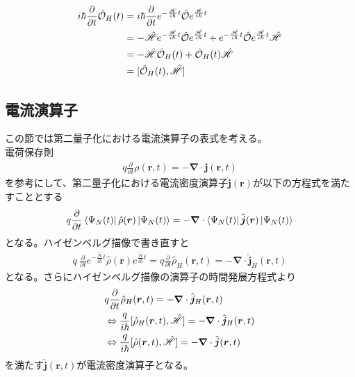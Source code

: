 \documentclass[dvipdfmx, 11pt, a4paper]{jsarticle}
\theoremstyle{definition}
\numberwithin{equation}{section}
\begin{document}
    \begin{derivationBox}
        \begin{align}
            i\hbar \frac{\partial}{\partial t} \hat{\mathcal{O}}_H(t) &= i\hbar \frac{\partial}{\partial t} e^{-\frac{\hat{\mathscr{H}}}{i\hbar}t} \hat{\mathcal{O}} e^{\frac{\hat{\mathscr{H}}}{i\hbar}t} \notag \\
            &= -\hat{\mathscr{H}} e^{-\frac{\hat{\mathscr{H}}}{i\hbar}t} \hat{\mathcal{O}} e^{\frac{\hat{\mathscr{H}}}{i\hbar}t} + e^{-\frac{\hat{\mathscr{H}}}{i\hbar}t} \hat{\mathcal{O}}e^{\frac{\hat{\mathscr{H}}}{i\hbar}t} \hat{\mathscr{H}}  \notag \\
            &= -\hat{\mathscr{H}}  \hat{\mathcal{O}}_H(t)  +  \hat{\mathcal{O}}_H(t) \hat{\mathscr{H}}  \notag \\
            &= [\hat{\mathcal{O}}_H(t),\hat{\mathscr{H}}]
        \end{align}
    \end{derivationBox}
\subsection{電流演算子}
    この節では第二量子化における電流演算子の表式を考える。\\
    電荷保存則
    \begin{align}
        q\frac{\partial}{\partial t} \rho(\bm{r},t) = -\bm{\nabla} \cdot \bm{j}(\bm{r},t)
    \end{align}
    を参考にして、第二量子化における電流密度演算子$\hat{\bm{j}}(\bm{r})$が以下の方程式を満たすこととする
    \begin{align}
        q\frac{\partial}{\partial t} \bra{\Psi_N(t)}\hat{\rho}(\bm{r})\ket{\Psi_N(t)} = -\bm{\nabla} \cdot \bra{\Psi_N(t)} \hat{\bm{j}}(\bm{r}) \ket{\Psi_N(t)}
    \end{align}
    となる。ハイゼンベルグ描像で書き直すと
    \begin{align}
        q\ \frac{\partial}{\partial t} e^{-\frac{\hat{\mathscr{H}}}{i\hbar}t} \hat{\rho}(\bm{r}) e^{\frac{\hat{\mathscr{H}}}{i\hbar}t} = q\frac{\partial}{\partial t} \hat{\rho}_H(\bm{r},t)= -\bm{\nabla}\cdot \hat{\bm{j}}_H (\bm{r},t)
    \end{align}
    となる。さらにハイゼンベルグ描像の演算子の時間発展方程式より
    \begin{align}
        &q\frac{\partial}{\partial t} \hat{\rho}_H(\bm{r},t)= -\bm{\nabla}\cdot \hat{\bm{j}}_H (\bm{r},t) \notag \\
        &\Leftrightarrow \frac{q}{i\hbar} [\hat{\rho}_H(\bm{r},t),\hat{\mathscr{H}}] =  -\bm{\nabla}\cdot \hat{\bm{j}}_H (\bm{r},t) \notag \\
        &\Leftrightarrow \frac{q}{i\hbar} [\hat{\rho}(\bm{r},t),\hat{\mathscr{H}}] =  -\bm{\nabla}\cdot \hat{\bm{j}} (\bm{r},t) 
    \end{align}
    を満たす$\hat{\bm{j}}(\bm{r},t)$が電流密度演算子となる。
\end{document}
